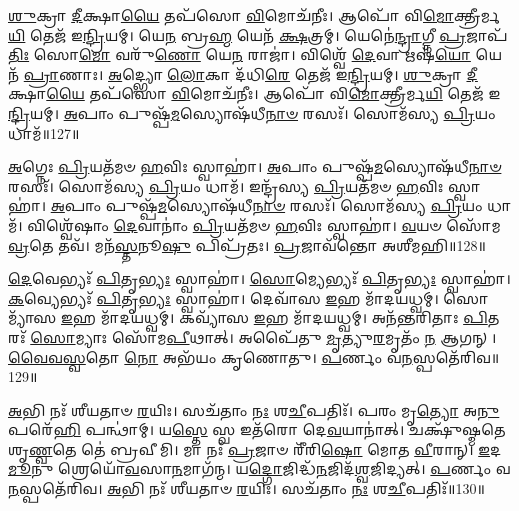 \-\ul{𑌶𑍁}\-𑌕𑍍𑌰𑌾 \ul{𑌦𑍀}\-𑌕𑍍𑌷𑌾\-\ul{𑌯𑍈} 𑌤𑌪᳴𑌸𑍋 \ul{𑌵𑌿}\-𑌮𑍋𑌚᳴𑌨𑍀𑌃।
𑌆𑌪𑍋᳴ 𑌵𑌿\-\ul{𑌮𑍋}\-𑌕𑍍𑌤𑍍𑌰𑍀𑌰𑍍𑌮\-\ul{𑌯𑌿} 𑌤𑍇𑌜᳴ 𑌇\-\ul{𑌨𑍍𑌦𑍍𑌰𑌿}\-𑌯𑌮𑍍।
𑌯𑍇\-\ul{𑌨} 𑌬𑍍𑌰\-\ul{𑌹𑍍𑌮} 𑌯𑍇𑌨᳴ \ul{𑌕𑍍𑌷}\-𑌤𑍍𑌰𑌮𑍍।
𑌯𑍇𑌨𑍇॑\-\ul{𑌨𑍍𑌦𑍍𑌰𑌾}\-𑌗𑍍𑌨𑍀 \ul{𑌪𑍍𑌰}\-𑌜𑌾\-𑌪᳴\-\ul{𑌤𑌿𑌃} 𑌸𑍋\-\ul{𑌮𑍋} 𑌵𑌰𑍁᳴\-\ul{𑌣𑍋} 𑌯𑍇\-\ul{𑌨} 𑌰𑌾𑌜𑌾॑।
𑌵𑌿𑌶𑍍𑌵𑍇᳴ \ul{𑌦𑍇}\-𑌵𑌾 𑌋𑌷᳴\-\ul{𑌯𑍋} 𑌯𑍇𑌨᳴ \ul{𑌪𑍍𑌰𑌾}\-𑌣𑌾𑌃।
\-\ul{𑌅}\-𑌦𑍍𑌭𑍍𑌯𑍋 \ul{𑌲𑍋}\-𑌕𑌾 𑌦᳴𑌧𑌿\-\ul{𑌰𑍇} 𑌤𑍇𑌜᳴ 𑌇\-\ul{𑌨𑍍𑌦𑍍𑌰𑌿}\-𑌯𑌮𑍍।
\-\ul{𑌶𑍁}\-𑌕𑍍𑌰𑌾 \ul{𑌦𑍀}\-𑌕𑍍𑌷𑌾\-\ul{𑌯𑍈} 𑌤𑌪᳴𑌸𑍋 \ul{𑌵𑌿}\-𑌮𑍋𑌚᳴𑌨𑍀𑌃।
𑌆𑌪𑍋᳴ 𑌵𑌿\-\ul{𑌮𑍋}\-𑌕𑍍𑌤𑍍𑌰𑍀𑌰𑍍𑌮\-\ul{𑌯𑌿} 𑌤𑍇𑌜᳴ 𑌇\-\ul{𑌨𑍍𑌦𑍍𑌰𑌿}\-𑌯𑌮𑍍।
\-\ul{𑌅}\-𑌪𑌾𑌂 𑌪𑍁𑌷𑍍𑌪᳴\-\ul{𑌮}\-𑌸𑍍𑌯𑍋𑌷᳴𑌧𑍀\-\ul{𑌨𑌾}\-\-\ul{𑍞} 𑌰𑌸𑌃᳴।
𑌸𑍋𑌮᳴𑌸𑍍𑌯 \ul{𑌪𑍍𑌰𑌿}\-𑌯𑌂 𑌧𑌾𑌮᳴॥127॥

\-\ul{𑌅}\-𑌗𑍍𑌨𑍇𑌃 \ul{𑌪𑍍𑌰𑌿}\-𑌯𑌤᳴𑌮𑍞 \ul{𑌹}\-𑌵𑌿𑌃 𑌸𑍍𑌵𑌾𑌹𑌾॑।
\-\ul{𑌅}\-𑌪𑌾𑌂 𑌪𑍁𑌷𑍍𑌪᳴\-\ul{𑌮}\-𑌸𑍍𑌯𑍋𑌷᳴𑌧𑍀\-\ul{𑌨𑌾}\-\-\ul{𑍞} 𑌰𑌸𑌃᳴।
𑌸𑍋𑌮᳴𑌸𑍍𑌯 \ul{𑌪𑍍𑌰𑌿}\-𑌯𑌂 𑌧𑌾𑌮᳴।
𑌇𑌨𑍍𑌦𑍍𑌰᳴𑌸𑍍𑌯 \ul{𑌪𑍍𑌰𑌿}\-𑌯𑌤᳴𑌮𑍞 \ul{𑌹}\-𑌵𑌿𑌃 𑌸𑍍𑌵𑌾𑌹𑌾॑।
\-\ul{𑌅}\-𑌪𑌾𑌂 𑌪𑍁𑌷𑍍𑌪᳴\-\ul{𑌮}\-𑌸𑍍𑌯𑍋𑌷᳴𑌧𑍀\-\ul{𑌨𑌾}\-\-\ul{𑍞} 𑌰𑌸𑌃᳴।
𑌸𑍋𑌮᳴𑌸𑍍𑌯 \ul{𑌪𑍍𑌰𑌿}\-𑌯𑌂 𑌧𑌾𑌮᳴।
𑌵𑌿𑌶𑍍𑌵𑍇᳴𑌷𑌾𑌂 \ul{𑌦𑍇}\-𑌵𑌾𑌨𑌾𑌂॑ \ul{𑌪𑍍𑌰𑌿}\-𑌯𑌤᳴𑌮𑍞 \ul{𑌹}\-𑌵𑌿𑌃 𑌸𑍍𑌵𑌾𑌹𑌾॑।
\-\ul{𑌵}\-𑌯𑍞 𑌸𑍋᳴𑌮 \ul{𑌵𑍍𑌰}\-𑌤𑍇 𑌤𑌵᳴।
𑌮𑌨᳴\-\ul{𑌸𑍍𑌤}\-𑌨𑍂\-\ul{𑌷𑍁} 𑌪𑌿𑌪𑍍𑌰᳴𑌤𑌃।
\-\ul{𑌪𑍍𑌰}\-𑌜𑌾𑌵᳴𑌨𑍍𑌤𑍋 𑌅𑌶𑍀𑌮𑌹𑌿॥128॥

\-\ul{𑌦𑍇}\-𑌵𑍇𑌭𑍍𑌯𑌃᳴ \ul{𑌪𑌿}\-𑌤𑍃\-\ul{𑌭𑍍𑌯𑌃} 𑌸𑍍𑌵𑌾𑌹𑌾॑।
\-\ul{𑌸𑍋}\-𑌮𑍍𑌯𑍇𑌭𑍍𑌯𑌃᳴ \ul{𑌪𑌿}\-𑌤𑍃\-\ul{𑌭𑍍𑌯𑌃} 𑌸𑍍𑌵𑌾𑌹𑌾॑।
\-\ul{𑌕}\-𑌵𑍍𑌯𑍇𑌭𑍍𑌯𑌃᳴ \ul{𑌪𑌿}\-𑌤𑍃\-\ul{𑌭𑍍𑌯𑌃} 𑌸𑍍𑌵𑌾𑌹𑌾॑।
𑌦𑍇𑌵𑌾᳴𑌸 \ul{𑌇}\-𑌹 𑌮𑌾᳴𑌦𑌯𑌧𑍍𑌵𑌮𑍍।
𑌸𑍋𑌮𑍍𑌯𑌾᳴𑌸 \ul{𑌇}\-𑌹 𑌮𑌾᳴𑌦𑌯𑌧𑍍𑌵𑌮𑍍।
𑌕𑌵𑍍𑌯𑌾᳴𑌸 \ul{𑌇}\-𑌹 𑌮𑌾᳴𑌦𑌯𑌧𑍍𑌵𑌮𑍍।
𑌅𑌨᳴𑌨𑍍𑌤𑌰𑌿𑌤𑌾𑌃 \ul{𑌪𑌿}\-𑌤𑌰𑌃᳴ \ul{𑌸𑍋}\-𑌮𑍍𑌯𑌾𑌃 𑌸𑍋᳴𑌮\-\ul{𑌪𑍀}\-𑌥𑌾𑌤𑍍।
𑌅𑌪𑍈᳴𑌤𑍁 \ul{𑌮𑍃}\-𑌤𑍍𑌯𑍁\-\ul{𑌰}\-𑌮𑍃𑌤𑌂᳴ \ul{𑌨} 𑌆𑌗𑌨𑍍।
\-\ul{𑌵𑍈}\-\-\ul{𑌵}\-\-\ul{𑌸𑍍𑌵}\-𑌤𑍋 \ul{𑌨𑍋} 𑌅𑌭᳴𑌯𑌂 𑌕𑍃𑌣𑍋𑌤𑍁।
\-\ul{𑌪}\-𑌰𑍍𑌣𑌂 𑌵\-\ul{𑌨}\-𑌸𑍍𑌪𑌤𑍇᳴𑌰𑌿𑌵॥129॥

\-\ul{𑌅}\-𑌭𑌿 𑌨𑌃᳴ 𑌶𑍀𑌯𑌤𑌾𑍞 \ul{𑌰}\-𑌯𑌿𑌃।
𑌸𑌚᳴𑌤𑌾𑌂 \ul{𑌨𑌃} 𑌶\-\ul{𑌚𑍀}\-𑌪𑌤𑌿𑌃᳴।
𑌪𑌰𑌂 𑌮𑍃\-\ul{𑌤𑍍𑌯𑍋} 𑌅\-\ul{𑌨𑍁} 𑌪𑌰𑍇᳴\-\ul{𑌹𑌿} 𑌪𑌨𑍍𑌥𑌾॑𑌮𑍍।
𑌯\-\ul{𑌸𑍍𑌤𑍇} 𑌸𑍍𑌵 𑌇𑌤᳴𑌰𑍋 𑌦𑍇\-\ul{𑌵}\-𑌯𑌾𑌨𑌾॑𑌤𑍍।
𑌚𑌕𑍍𑌷𑍁᳴𑌷𑍍𑌮𑌤𑍇 𑌶𑍃\-\ul{𑌣𑍍𑌵}\-𑌤𑍇 𑌤𑍇॑ 𑌬𑍍𑌰𑌵𑍀𑌮𑌿।
𑌮𑌾 𑌨𑌃᳴ \ul{𑌪𑍍𑌰}\-𑌜𑌾𑍞 𑌰𑍀᳴𑌰𑌿\-\ul{𑌷𑍋} 𑌮𑍋𑌤 \ul{𑌵𑍀}\-𑌰𑌾𑌨𑍍।
\-\ul{𑌇}\-𑌦\-\ul{𑌮𑍂}\-𑌨𑍁 𑌶𑍍𑌰𑍇𑌯𑍋᳴\-\ul{𑌵}\-𑌸𑌾\-\ul{𑌨}\-𑌮𑌾𑌗᳴𑌨𑍍𑌮।
𑌯\-\ul{𑌦𑍍𑌗𑍋}\-𑌜𑌿𑌦𑍍𑌧᳴\-\ul{𑌨}\-𑌜𑌿𑌦᳴\-\ul{𑌶𑍍𑌵}\-𑌜𑌿𑌦𑍍𑌯𑌤𑍍।
\-\ul{𑌪}\-𑌰𑍍𑌣𑌂 𑌵\-\ul{𑌨}\-𑌸𑍍𑌪𑌤𑍇᳴𑌰𑌿𑌵।
\-\ul{𑌅}\-𑌭𑌿 𑌨𑌃᳴ 𑌶𑍀𑌯𑌤𑌾𑍞 \ul{𑌰}\-𑌯𑌿𑌃।
𑌸𑌚᳴𑌤𑌾𑌂 \ul{𑌨𑌃} 𑌶\-\ul{𑌚𑍀}\-𑌪𑌤𑌿𑌃᳴॥130॥\anuvakamend[𑌵\-\ul{𑌨}\-𑌸𑍍𑌪𑌤𑌾᳴\-\ul{𑌵}\-𑌦𑍍𑌭𑍍𑌯𑍋 \ul{𑌲𑍋}\-𑌕𑌾 𑌦᳴𑌧𑌿\-\ul{𑌰𑍇} 𑌤𑍇𑌜᳴ 𑌇\-\ul{𑌨𑍍𑌦𑍍𑌰𑌿}\-𑌯𑌂 𑌧𑌾𑌮𑌾᳴𑌶𑍀𑌮𑌹𑍀\-\ul{𑌵𑌾}\-𑌭𑌿𑌨𑌃᳴ 𑌶𑍀𑌯𑌤𑌾𑍞 \ul{𑌰}\-𑌯𑌿𑌰𑍇𑌕𑌂᳴ 𑌚]




